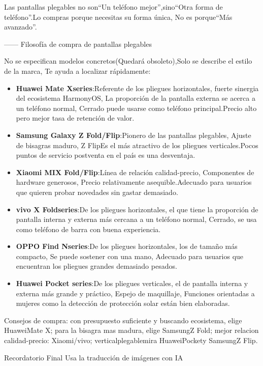 Las pantallas plegables no son“Un teléfono mejor”,sino“Otra forma de teléfono”.Lo compras porque necesitas su forma única, No es porque“Más avanzado”.

—— Filosofía de compra de pantallas plegables


No se especifican modelos concretos(Quedará obsoleto),Solo se describe el estilo de la marca, Te ayuda a localizar rápidamente:

\begin{itemize}
  \item \textbf{Huawei Mate Xseries}:Referente de los pliegues horizontales, fuerte sinergia del ecosistema HarmonyOS, La proporción de la pantalla externa se acerca a un teléfono normal, Cerrado puede usarse como teléfono principal.Precio alto pero mejor tasa de retención de valor.
  \item \textbf{Samsung Galaxy Z Fold/Flip}:Pionero de las pantallas plegables, Ajuste de bisagras maduro, Z FlipEs el más atractivo de los pliegues verticales.Pocos puntos de servicio postventa en el país es una desventaja.
  \item \textbf{Xiaomi MIX Fold/Flip}:Línea de relación calidad-precio, Componentes de hardware generosos, Precio relativamente asequible.Adecuado para usuarios que quieren probar novedades sin gastar demasiado.
  \item \textbf{vivo X Foldseries}:De los pliegues horizontales, el que tiene la proporción de pantalla interna y externa más cercana a un teléfono normal, Cerrado, se usa como teléfono de barra con buena experiencia.
  \item \textbf{OPPO Find Nseries}:De los pliegues horizontales, los de tamaño más compacto, Se puede sostener con una mano, Adecuado para usuarios que encuentran los pliegues grandes demasiado pesados.
  \item \textbf{Huawei Pocket series}:De los pliegues verticales, el de pantalla interna y externa más grande y práctico, Espejo de maquillaje, Funciones orientadas a mujeres como la detección de protección solar están bien elaboradas.
\end{itemize}

Consejos de compra: con presupuesto suficiente y buscando ecosistema, elige HuaweiMate X; para la bisagra mas madura, elige SamsungZ Fold; mejor relacion calidad-precio: Xiaomi/vivo; verticalplegablemira HuaweiPockety SamsungZ Flip.

\begin{tcbinfo}{Recordatorio Final}
Usa la traducción de imágenes con IA

\end{tcbinfo}
